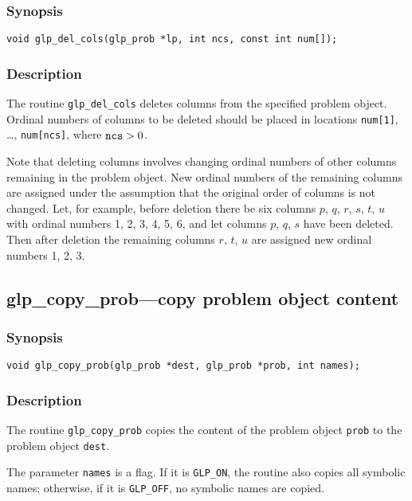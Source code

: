 \subsubsection*{Synopsis}

\begin{verbatim}
void glp_del_cols(glp_prob *lp, int ncs, const int num[]);
\end{verbatim}

\subsubsection*{Description}

The routine \verb|glp_del_cols| deletes columns from the specified
problem object. Ordinal numbers of columns to be deleted should be
placed in locations \verb|num[1]|, \dots, \verb|num[ncs]|, where
${\tt ncs}>0$.

Note that deleting columns involves changing ordinal numbers of other
columns remaining in the problem object. New ordinal numbers of the
remaining columns are assigned under the assumption that the original
order of columns is not changed. Let, for example, before deletion there
be six columns $p$, $q$, $r$, $s$, $t$, $u$ with ordinal numbers 1, 2,
3, 4, 5, 6, and let columns $p$, $q$, $s$ have been deleted. Then after
deletion the remaining columns $r$, $t$, $u$ are assigned new ordinal
numbers 1, 2, 3.

\subsection{glp\_copy\_prob---copy problem object content}

\subsubsection*{Synopsis}

\begin{verbatim}
void glp_copy_prob(glp_prob *dest, glp_prob *prob, int names);
\end{verbatim}

\subsubsection*{Description}

The routine \verb|glp_copy_prob| copies the content of the problem
object \verb|prob| to the problem object \verb|dest|.

The parameter \verb|names| is a flag. If it is \verb|GLP_ON|,
the routine also copies all symbolic names; otherwise, if it is
\verb|GLP_OFF|, no symbolic names are copied.

